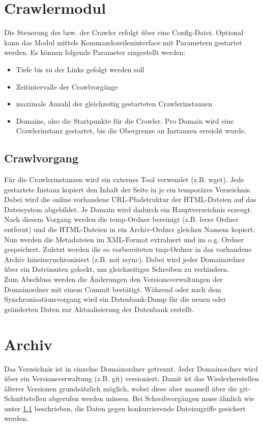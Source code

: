 \section{Crawlermodul}
Die Steuerung des bzw. der Crawler erfolgt über eine Config-Datei. 
Optional kann das Modul mittels Kommandozeileninterface mit Parametern gestartet werden.
Es können folgende Parameter eingestellt werden:
\begin{itemize}
	\item Tiefe bis zu der Links gefolgt werden soll
	\item Zeitintervalle der Crawlvorgänge
	\item maximale Anzahl der gleichzeitig gestarteten Crawlerinstanzen
	\item Domains, also die Startpunkte für die Crawler. 
		Pro Domain wird eine Crawlerinstanz gestartet, bis die Obergrenze an Instanzen erreicht wurde.
\end{itemize}

\subsection{Crawlvorgang} \label{l:spez:crawler}
Für die Crawlerinstanzen wird ein externes Tool verwendet (z.B. wget).
Jede gestartete Instanz kopiert den Inhalt der Seite in je ein temporäres Verzeichnis.
Dabei wird die online vorhandene URL-Pfadstruktur der HTML-Dateien auf das Dateisystem abgebildet.
Je Domain wird dadurch ein Hauptverzeichnis erzeugt. \\
Nach diesem Vorgang werden die temp-Ordner bereinigt (z.B. leere Ordner entfernt)
und die HTML-Dateien in ein Archiv-Ordner gleichen Namens kopiert.
Nun werden die Metadateien im XML-Format extrahiert und im o.g. Ordner gespeichert.
Zuletzt werden die so vorbereiteten tmp-Ordner in das vorhandene Archiv hineinsynchronisiert (z.B. mit rsync). 
Dabei wird jeder Domainordner über ein Dateimutex gelockt, um
gleichzeitiges Schreiben zu verhindern. \\
Zum Abschluss werden die Änderungen den Versionsverwaltungen der Domainordner mit einem Commit bestätigt.
Während oder nach dem Synchronisationsvorgang wird ein Datenbank-Dump für die neuen oder geänderten Daten
zur Aktualisierung der Datenbank erstellt.

\section{Archiv}
Das Verzeichnis ist in einzelne Domainordner getrennt. Jeder Domainordner wird über ein Versionsverwaltung
(z.B. git) versioniert. Damit ist das Wiederherstellen älterer Versionen grundsätzlich möglich,
wobei diese aber manuell über die git-Schnittstellen abgerufen werden müssen.
Bei Schreibvorgängen muss ähnlich wie unter \ref{l:spez:crawler} beschrieben, 
die Daten gegen konkurrierende Dateizugriffe gesichert werden.
